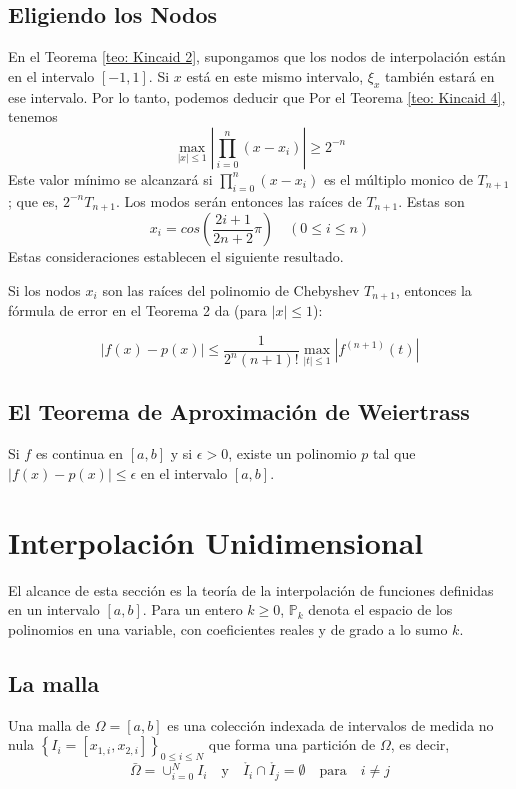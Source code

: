 \subsection{Eligiendo los Nodos}
En el Teorema \ref{teo: Kincaid 2}, supongamos que los nodos de interpolación están en el intervalo \([-1, 1]\). Si \( x \) está en este mismo intervalo, \( \xi_x \) también estará en ese intervalo. Por lo tanto, podemos deducir que
\noindent {}
Por el Teorema \ref{teo: Kincaid 4}, tenemos
\[ \max_{|x| \leq 1} \left| \prod_{i = 0}^{n} (x - x_i) \right| \geq 2^{-n} \]
Este valor mínimo se alcanzará si $\prod_{i = 0}^{n} (x - x_i)$ es el múltiplo monico de
$T_{n + 1}$; que es, $2^{-n}T_{n + 1}$. Los modos serán entonces las raíces de \( T_{n+1} \). Estas son
\[ x_i = cos \left( \frac{2i + 1}{2n + 2} \pi \right) \quad (0 \leq i \leq n) \]
Estas consideraciones establecen el siguiente resultado.
\begin{theorem}
Si los nodos \( x_i \) son las raíces del polinomio de Chebyshev \( T_{n+1} \), entonces la fórmula de error en el Teorema 2 da (para \( |x| \leq 1 \)):

\[ |f(x) - p(x)| \leq \frac{1}{2^n (n+1)!} \max_{|t| \leq 1} |f^{(n + 1)}(t)| \]
    
\end{theorem}

\subsection{El Teorema de Aproximación de Weiertrass}
\begin{theorem}
    Si $f$ es continua en $[a, b]$ y si $\epsilon > 0$, existe un polinomio $p$ tal que $|f(x) - p(x)| \leq \epsilon$ en el intervalo $[a, b]$.
\end{theorem}

\section{Interpolación Unidimensional}
El alcance de esta sección es la teoría de la interpolación de funciones definidas en un intervalo $[a, b]$. Para un entero $k \geq 0$, $\mathbb{P}_k$ denota el espacio de los polinomios en una variable, con coeficientes reales y de grado a lo sumo $k$.

\subsection{La malla}
Una malla de $\Omega = [a, b]$ es una colección indexada de intervalos de medida no nula $\left\{ I_i = [x_{1, i}, x_{2, i}] \right\}_{0 \leq i \leq N}$ que forma una partición de $\Omega$, es decir,
\begin{equation}
    \label{eq: TAMU 1.1}
    \bar{\Omega} = \cup_{i = 0}^{N} I_i \quad \text{y} \quad \mathring{I_i} \cap \mathring{I_j} = \emptyset \quad \text{para} \quad i \neq j
\end{equation}

